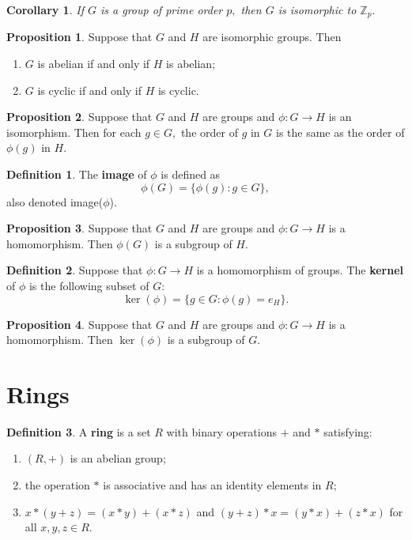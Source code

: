\documentclass[12pt, a4paper]{article}
\newcommand{\bb}[1]{\mathbb{#1}}
\theoremstyle{definition}
\newtheorem{definition}{Definition}[section]
\newtheorem{proposition}{Proposition}
\theoremstyle{plain}
\newtheorem{corollary}{Corollary}[theorem]
\begin{document}
\begin{corollary}
If $G$ is a group of prime order $p,$ then $G$ is isomorphic to $\bb{Z}_p.$
\end{corollary}

\begin{proposition}
Suppose that $G$ and $H$ are isomorphic groups. Then
\begin{enumerate}
	
	\item $G$ is abelian if and only if $H$ is abelian;

	\item $G$ is cyclic if and only if $H$ is cyclic.
\end{enumerate}
\end{proposition}

\begin{proposition}
Suppose that $G$ and $H$ are groups and $\phi : G \to H$ is an isomorphism. Then for each $g \in G,$ the order of $g$ in $G$ is the same as the order of $\phi(g)$ in $H.$
\end{proposition}

\begin{definition}
The \textbf{image} of $\phi$ is defined as 
$$\phi(G)=\{\phi(g) : g \in G\},$$ also denoted image($\phi$).
\end{definition}

\begin{proposition}
Suppose that $G$ and $H$ are groups and $\phi : G \to H$ is a homomorphism. Then $\phi(G)$ is a subgroup of $H.$
\end{proposition}

\begin{definition}
Suppose that $\phi : G \to H$ is a homomorphism of groups.
The \textbf{kernel} of $\phi$ is the following subset of $G:$
$$\ker(\phi)=\{g\in G : \phi(g) =e_H\}.$$
\end{definition}

\begin{proposition}
Suppose that $G$ and $H$ are groups and $\phi : G \to H$ is a homomorphism. Then $\ker(\phi)$ is a subgroup of $G.$
\end{proposition}

\pagebreak

\section{Rings}

\begin{definition}
A \textbf{ring} is a set $R$ with binary operations $+$ and $*$ satisfying:
\begin{enumerate}
	
	\item $(R,+)$ is an abelian group;

	\item the operation $*$ is associative and has an identity elements in $R;$

	\item $x*(y+z)=(x*y)+(x*z)$ and $(y+z)*x=(y*x)+(z*x)$ for all $x, y, z \in R.$

\end{enumerate}
\end{definition}
\end{document}
